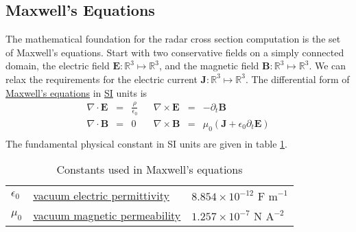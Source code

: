 \subsection{Maxwell's Equations}
The mathematical foundation for the radar cross section computation is the set of Maxwell's equations.
Start with two conservative fields on a simply connected domain, the electric field $\mathbf{E}\colon\mathbb{R}^{3}\mapsto\mathbb{R}^{3}$, and the magnetic field $\mathbf{B}\colon\mathbb{R}^{3}\mapsto\mathbb{R}^{3}$. We can relax the requirements for the electric current $\mathbf{J}\colon\mathbb{R}^{3}\mapsto\mathbb{R}^{3}$.
The differential form of \href{https://physics.info/maxwell/}{Maxwell's equations} in \href{https://www.nist.gov/pml/weights-and-measures/metric-si/si-units}{SI} units is
\begin{equation}
	\begin{array}{rclcrcl}
		\nabla \cdot \mathbf{E} &= &\frac{\rho}{\epsilon_{0}}
		&&\nabla \times \mathbf{E} &= &- \partial_{t}\mathbf{B} \\ 
		\nabla \cdot \mathbf{B} &= &0
		&&\nabla \times \mathbf{B} &= &\mu_{0} \left( \mathbf{J} + \epsilon_{0} \partial_{t}\mathbf{E} \right) \\ 
	\end{array}
\label{eq:Maxwell-differential}
\end{equation}
%
The fundamental physical constant in SI units are given in table \ref{tab:mu-eps}.
%
\begin{table}
	\begin{center}
		\begin{tabular}{lll}
	$\epsilon_{0}$ 
		& \href{https://en.wikipedia.org/wiki/Vacuum_permittivity}{vacuum electric permittivity} 
		& \href{https://physics.nist.gov/cgi-bin/cuu/Value?ep0}{$8.854 \times 10^{-12} \text{ F m}^{-1}$} \\
	$\mu_{0}$ 
		& \href{https://en.wikipedia.org/wiki/Vacuum_permeability}{vacuum magnetic permeability}
		& \href{https://physics.nist.gov/cgi-bin/cuu/Value?mu0}{$1.257 \times 10^{-7} \text{ N A}^{-2}$}
		\end{tabular}
	\end{center}
\caption{Constants used in Maxwell's equations}
\label{tab:mu-eps}
\end{table}

